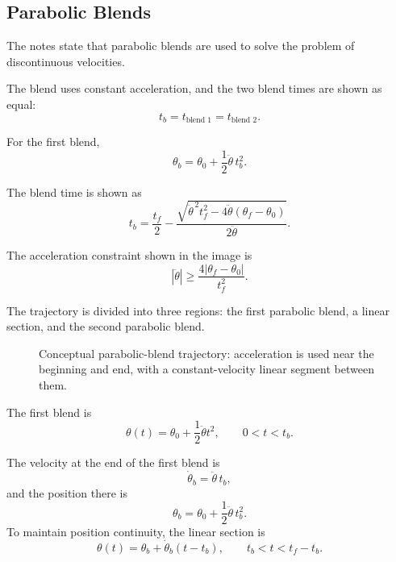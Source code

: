 \documentclass[11pt]{article}
\begin{document}
\subsection{Parabolic Blends}

The notes state that parabolic blends are used to solve the problem of discontinuous velocities.

The blend uses constant acceleration, and the two blend times are shown as equal:
\[
t_b=t_{\text{blend 1}}=t_{\text{blend 2}}.
\]

For the first blend,
\[
\boxed{
\theta_b
=
\theta_0
+
\frac{1}{2}\ddot\theta\,t_b^2
}.
\]

The blend time is shown as
\[
\boxed{
t_b
=
\frac{t_f}{2}
-
\frac{
\sqrt{
\ddot\theta^{\,2}t_f^2
-
4\ddot\theta(\theta_f-\theta_0)
}
}{
2\ddot\theta
}
}.
\]

The acceleration constraint shown in the image is
\[
\boxed{
|\ddot\theta|
\geq
\frac{4|\theta_f-\theta_0|}{t_f^2}
}.
\]

The trajectory is divided into three regions: the first parabolic blend, a linear section, and the second parabolic blend.

\begin{figure}[ht]
\centering
{}
\caption{Conceptual parabolic-blend trajectory: acceleration is used near the beginning and end, with a constant-velocity linear segment between them.}
\end{figure}

The first blend is
\[
\theta(t)
=
\theta_0
+
\frac{1}{2}\ddot\theta t^2,
\qquad
0<t<t_b.
\]

The velocity at the end of the first blend is
\[
\dot\theta_b=\ddot\theta\,t_b,
\]
and the position there is
\[
\theta_b=\theta_0+\frac{1}{2}\ddot\theta\,t_b^2.
\]
To maintain position continuity, the linear section is
\[
\theta(t)
=
\theta_b
+
\dot\theta_b(t-t_b),
\qquad
t_b<t<t_f-t_b.
\]
\end{document}
